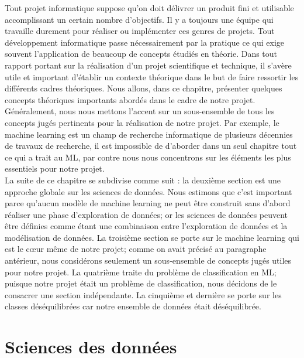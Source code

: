 \documentclass[12pt, french]{report}
\begin{document}
Tout projet informatique suppose qu'on doit délivrer un produit fini et utilisable accomplissant un certain nombre d'objectifs. Il y a toujours une équipe qui travaille durement pour réaliser ou implémenter ces genres de projets. Tout développement informatique passe nécessairement par la pratique ce qui exige souvent l'application de beaucoup de concepts étudiés en théorie. Dans tout rapport portant sur la réalisation d'un projet scientifique et technique, il s'avère utile et important d'établir un contexte théorique dans le but de faire ressortir les différents cadres théoriques. Nous allons, dans ce chapitre, présenter quelques concepts théoriques importants abordés dans le cadre de notre projet.\\

Généralement, nous nous mettons l'accent sur un sous-ensemble de tous les concepts jugés pertinents pour la réalisation de notre projet. Par exemple, le machine learning est un champ de recherche informatique de plusieurs décennies de travaux de recherche, il est impossible de d'aborder dans un seul chapitre tout ce qui a trait au ML, par contre nous nous concentrons sur les éléments les plus essentiels pour notre projet. \\      

La suite de ce chapitre se subdivise comme suit : la deuxième section est une approche globale sur les sciences de données. Nous estimons que c'est important parce qu'aucun modèle de machine learning ne peut être construit sans d'abord réaliser une phase d'exploration de données; or les sciences de données peuvent être définies comme étant une combinaison entre l'exploration de données et la modélisation de données. La troisième section se porte sur le machine learning qui est le cœur même de notre projet; comme on avait précisé au paragraphe antérieur, nous considérons seulement un sous-ensemble de concepts jugés utiles pour notre projet. La quatrième traite du problème de classification en ML; puisque notre projet était un problème de classification, nous décidons de le consacrer une section indépendante. La cinquième et dernière se porte sur les classes déséquilibrées car notre ensemble de données était déséquilibrée.     

\section{Sciences des données} \label{datascience}
\end{document}
